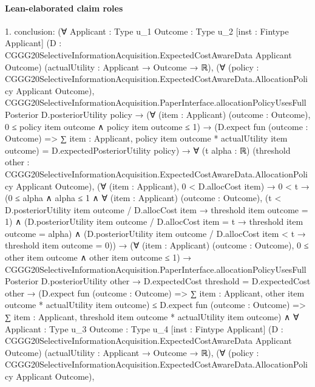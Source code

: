 \documentclass[10pt]{article}
\begin{document}
\paragraph{Lean-elaborated claim roles}\begin{ReviewVerbatim}
1. conclusion: (∀ {Applicant : Type u_1} {Outcome : Type u_2} [inst : Fintype Applicant]
    (D : CGGG20SelectiveInformationAcquisition.ExpectedCostAwareData Applicant Outcome)
    (actualUtility : Applicant → Outcome → ℝ),
    (∀ (policy : CGGG20SelectiveInformationAcquisition.ExpectedCostAwareData.AllocationPolicy Applicant Outcome),
        CGGG20SelectiveInformationAcquisition.PaperInterface.allocationPolicyUsesFullPosterior D.posteriorUtility
            policy →
          (∀ (item : Applicant) (outcome : Outcome), 0 ≤ policy item outcome ∧ policy item outcome ≤ 1) →
            (D.expect fun (outcome : Outcome) => ∑ item : Applicant, policy item outcome * actualUtility item outcome) =
              D.expectedPosteriorUtility policy) →
      ∀ (t alpha : ℝ)
        (threshold other :
          CGGG20SelectiveInformationAcquisition.ExpectedCostAwareData.AllocationPolicy Applicant Outcome),
        (∀ (item : Applicant), 0 < D.allocCost item) →
          0 < t →
            (0 ≤ alpha ∧
                alpha ≤ 1 ∧
                  ∀ (item : Applicant) (outcome : Outcome),
                    (t < D.posteriorUtility item outcome / D.allocCost item → threshold item outcome = 1) ∧
                      (D.posteriorUtility item outcome / D.allocCost item = t → threshold item outcome = alpha) ∧
                        (D.posteriorUtility item outcome / D.allocCost item < t → threshold item outcome = 0)) →
              (∀ (item : Applicant) (outcome : Outcome), 0 ≤ other item outcome ∧ other item outcome ≤ 1) →
                CGGG20SelectiveInformationAcquisition.PaperInterface.allocationPolicyUsesFullPosterior
                    D.posteriorUtility other →
                  D.expectedCost threshold = D.expectedCost other →
                    (D.expect fun (outcome : Outcome) =>
                        ∑ item : Applicant, other item outcome * actualUtility item outcome) ≤
                      D.expect fun (outcome : Outcome) =>
                        ∑ item : Applicant, threshold item outcome * actualUtility item outcome) ∧
  ∀ {Applicant : Type u_3} {Outcome : Type u_4} [inst : Fintype Applicant]
    (D : CGGG20SelectiveInformationAcquisition.ExpectedCostAwareData Applicant Outcome)
    (actualUtility : Applicant → Outcome → ℝ),
    (∀ (policy : CGGG20SelectiveInformationAcquisition.ExpectedCostAwareData.AllocationPolicy Applicant Outcome),

\end{ReviewVerbatim}
\end{document}
